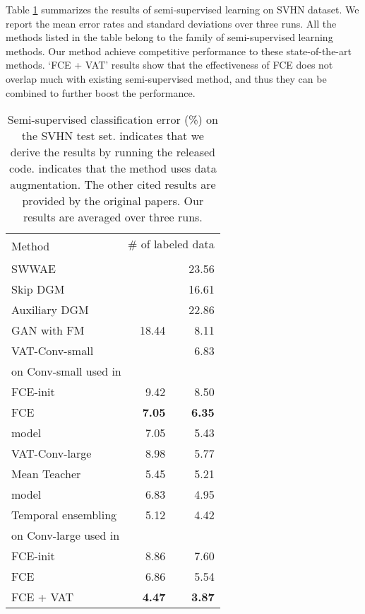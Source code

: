 \documentclass[10pt,twocolumn,letterpaper]{article}
\begin{document}
Table \ref{tabl: semi} summarizes the results of semi-supervised learning on SVHN dataset. We report the mean error rates and standard deviations over three runs. All the methods listed in the table belong to the family of semi-supervised learning methods. Our method achieve competitive performance to these state-of-the-art methods. \lq FCE + VAT' results show that the effectiveness of FCE does not overlap much with existing semi-supervised method, and thus they can be combined to further boost the performance. 
\begin{table}
\centering
 \caption{Semi-supervised classification error (\%) on the SVHN test set.  indicates that we derive the results by running the released code.  indicates that the method uses data augmentation. The other cited results are provided by the original papers. Our results are averaged over three runs. }  
\footnotesize
 \begin{tabular}{lrr}
    \toprule
     \multirow{2}{*}{Method}   & \multicolumn{2}{c}{\# of labeled data} \\
     & \multicolumn{1}{c}{} & \multicolumn{1}{c}{}\\
        \midrule
     SWWAE \cite{zhao2015stacked}       & & 23.56\\
     Skip DGM \cite{maaloe2016auxiliary} && 16.61  \\
     Auxiliary DGM \cite{maaloe2016auxiliary} &   & 22.86\\
     GAN with FM \cite{salimans2016improved} & 18.44  & 8.11 \\
     VAT-Conv-small \cite{miyato2018virtual}  & & 6.83  \\
     \midrule
     \multicolumn{2}{l}{on Conv-small used in \cite{salimans2016improved, miyato2018virtual}}\\
     FCE-init & 9.42  &  8.50 \\
     FCE & {\bf 7.05}  & {\bf 6.35} \\
     \midrule
      model \cite{laine2016temporal} &7.05 & 5.43 \\
      VAT-Conv-large \cite{miyato2018virtual} & 8.98  & 5.77 \\
           Mean Teacher \cite{tarvainen2017mean} & 5.45  & 5.21  \\
      model \cite{laine2016temporal} & 6.83 & 4.95 \\
     Temporal ensembling \cite{laine2016temporal} & 5.12  & 4.42  \\ 
      \midrule
     \multicolumn{2}{l}{on Conv-large used in \cite{laine2016temporal, miyato2018virtual}}\\
      FCE-init & 8.86  &  7.60 \\
     FCE & { 6.86}   & 5.54 \\
      FCE + VAT & {\bf 4.47}   & {\bf 3.87} \\ 
        \bottomrule
    \end{tabular}
    \label{tabl: semi}
\end{table}
\end{document}
